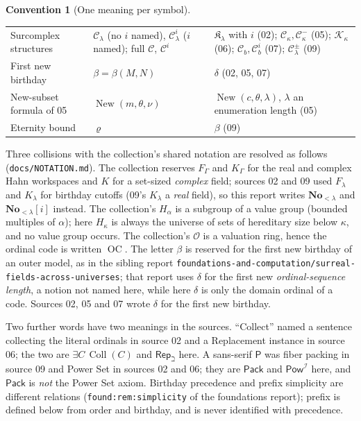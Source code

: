 \documentclass[11pt,letterpaper]{article}
\theoremstyle{definition}
\newtheorem{convention}[convention]{Convention}\aliascntresetthe{convention}
\theoremstyle{remark}
\newcommand{\No}{\mathbf{No}}
\newcommand{\C}{\mathcal C}
\newcommand{\I}{\mathcal I}
\newcommand{\Coll}{\operatorname{Coll}}
\newcommand{\OC}{\operatorname{OC}}
\newcommand{\Pack}{\mathsf{Pack}}
\newcommand{\PowI}{\mathsf{Pow}^{\I}}
\newcommand{\RepB}{\mathsf{Rep}_{\beth}}
\newcommand{\New}{\operatorname{New}}
\newcommand{\lbl}[1]{\nolinkurl{#1}}
\newcommand{\repo}[1]{\nolinkurl{#1}}
\begin{document}
\begin{convention}[One meaning per symbol]
\begin{center}
\begin{longtable}{@{}P{0.27\textwidth}P{0.34\textwidth}P{0.31\textwidth}@{}}
Surcomplex structures & $\C_\lambda$ (no $i$ named), $\C^i_\lambda$ ($i$ named); full $\C$, $\C^i$ & $\mathfrak K_\lambda$ with $i$ (02); $\C_\kappa,\C^-_\kappa$ (05); $\mathcal K_\kappa$ (06); $\C_b,\C_b^i$ (07); $\C^\pm_\lambda$ (09)\\
First new birthday & $\beta=\beta(M,N)$ & $\delta$ (02, 05, 07)\\
New-subset formula of 05 & $\New(m,\theta,\nu)$ & $\New(c,\theta,\lambda)$, $\lambda$ an enumeration length (05)\\
Eternity bound & $\varrho$ & $\beta$ (09)\\
\bottomrule
\end{longtable}
\end{center}
\end{convention}

Three collisions with the collection's shared notation are resolved as follows
(\repo{docs/NOTATION.md}). The collection reserves $F_\Gamma$ and $K_\Gamma$ for
the real and complex Hahn workspaces and $K$ for a set-sized \emph{complex}
field; sources 02 and 09 used $F_\lambda$ and $K_\lambda$ for birthday cutoffs
(09's $K_\lambda$ a \emph{real} field), so this report writes $\No_{<\lambda}$
and $\No_{<\lambda}[i]$ instead. The collection's $H_\alpha$ is a subgroup of a
value group (bounded multiples of $\alpha$); here $H_\kappa$ is always the
universe of sets of hereditary size below $\kappa$, and no value group
occurs. The collection's $\mathcal O$ is a valuation ring, hence the ordinal
code is written $\OC$. The letter $\beta$ is reserved for the first new
birthday of an outer model, as in the sibling report
\repo{foundations-and-computation/surreal-fields-across-universes}; that report
uses $\delta$ for the first new \emph{ordinal-sequence length}, a notion not
named here, while here $\delta$ is only the domain ordinal of a code. Sources
02, 05 and 07 wrote $\delta$ for the first new birthday.

Two further words have two meanings in the sources. ``Collect'' named a
sentence collecting the literal ordinals in source 02 and a Replacement instance
in source 06; the two are $\exists C\,\Coll(C)$ and $\RepB$ here. A
sans-serif $\mathsf P$ was fiber packing in source 09 and Power Set in sources
02 and 06; they are $\Pack$ and $\PowI$ here, and $\Pack$ is \emph{not} the
Power Set axiom. Birthday precedence and prefix simplicity are different
relations (\lbl{found:rem:simplicity} of the foundations report); prefix is
defined below from order and birthday, and is never identified with
precedence.
\end{document}
